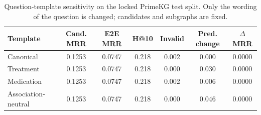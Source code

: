\begin{table}[t]
\centering
\small
\caption{Question-template sensitivity on the locked PrimeKG test split. Only the wording of the question is changed; candidates and subgraphs are fixed.}
\label{tab:template-sensitivity}
\begin{tabular}{lcccccc}
\toprule
Template & Cand. MRR & E2E MRR & H@10 & Invalid & Pred. change & $\Delta$MRR \\
\midrule
Canonical & 0.1253 & 0.0747 & 0.218 & 0.002 & 0.000 & 0.0000 \\
Treatment & 0.1253 & 0.0747 & 0.218 & 0.000 & 0.030 & 0.0000 \\
Medication & 0.1253 & 0.0747 & 0.218 & 0.002 & 0.006 & 0.0000 \\
Association-neutral & 0.1253 & 0.0747 & 0.218 & 0.000 & 0.046 & 0.0000 \\
\bottomrule
\end{tabular}
\end{table}
